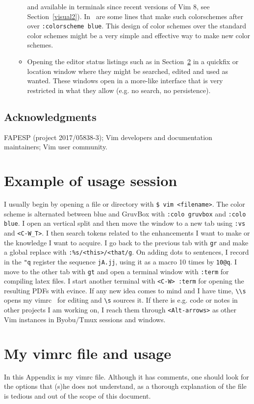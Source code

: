 \documentclass{article}
\newcommand{\ttt}[1] {
	\texttt{<#1>}}
\newcommand{\tttt}[1]{\texttt{#1}}
\begin{document}
\begin{itemize}
\begin{itemize}
        and available in terminals since recent versions of Vim 8, see Section~\ref{visual2}). In~\cite{vimrc} are some lines that make such colorschemes after over
        \tttt{:colorscheme blue}.
        This design of color schemes over the standard color schemes might be
        a very simple and effective way to make new color schemes.
      \item Opening the editor status listings such as in Section~\ref{}
        in a quickfix or location window where they might be searched, edited
        and used as wanted.
        These windows open in a more-like interface that is very restricted in what
        they allow (e.g. no search, no persistence).
    \end{itemize}
\end{itemize}

\subsection*{Acknowledgments}
FAPESP (project 2017/05838-3); Vim developers and documentation maintainers;
Vim user community. 

\appendix
\section{Example of usage session}
I usually begin by opening a file or directory
with \tttt{\$ vim <filename>}.
The color scheme is alternated between
blue and GruvBox with
\tttt{:colo gruvbox} and \tttt{:colo blue}.
I open an vertical split and then move
the window to a new tab using
\tttt{:vs} and \ttt{C-W\_T}.
I then search tokens related to
the enhancements I want to make or
the knowledge I want to acquire.
I go back to the previous tab with \tttt{gr}
and make a global replace with
\tttt{:\%s/<this>/<that/g}.
On adding dots to sentences,
I record in the \tttt{"q} register
the sequence \tttt{jA.jj},
using it as a macro 10 times by
\tttt{10@q}.
I move to the other tab with \tttt{gt}
and open a terminal window with \tttt{:term}
for compiling latex files.
I start another terminal with \tttt{<C-W> :term}
for opening the resulting PDFs with evince.
If any new idea comes to mind and I have time,
\tttt{\textbackslash\textbackslash s} opens 
my vimrc~\cite{vimrc} for editing and \tttt{\textbackslash s}
sources it.
If there is e.g. code or notes in other projects I am working
on, I reach them through \tttt{<Alt-arrows>} as other Vim instances
in Byobu/Tmux sessions and windows.

\section{My vimrc file and usage}
In this Appendix is my vimrc file.
Although it has comments, one should
look for the options that (s)he does
not understand, as a thorough explanation
of the file is tedious and out of the scope
of this document.
\end{document}
